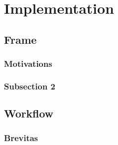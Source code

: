\chapter{Implementation} %

\label{Chapter5} %



\section{Frame}


\subsection{Motivations}


\subsection{Subsection 2}


\section{Workflow}


\subsection{Brevitas}


